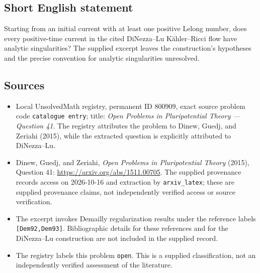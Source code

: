 \documentclass[11pt]{article}
\begin{document}
\subsection{Short English statement}
Starting from an initial current with at least one positive Lelong number, does every positive-time current in the cited DiNezza--Lu K\"ahler--Ricci flow have analytic singularities? The supplied excerpt leaves the construction's hypotheses and the precise convention for analytic singularities unresolved.
\subsection{Sources}
\begin{itemize}
\item Local UnsolvedMath registry, permanent ID \(800909\), exact source problem code \texttt{catalogue entry}; title: \emph{Open Problems in Pluripotential Theory --- Question 41}. The registry attributes the problem to Dinew, Guedj, and Zeriahi (2015), while the extracted question is explicitly attributed to DiNezza--Lu.
\item Dinew, Guedj, and Zeriahi, \emph{Open Problems in Pluripotential Theory} (2015), Question 41: \url{https://arxiv.org/abs/1511.00705}. The supplied provenance records access on 2026-10-16 and extraction by \texttt{arxiv\_latex}; these are supplied provenance claims, not independently verified access or source verification.
\item The excerpt invokes Demailly regularization results under the reference labels \texttt{[Dem92,Dem93]}. Bibliographic details for these references and for the DiNezza--Lu construction are not included in the supplied record.
\item The registry labels this problem \texttt{open}. This is a supplied classification, not an independently verified assessment of the literature.
\end{itemize}
\end{document}
